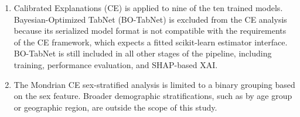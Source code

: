 \begin{enumerate}
    \item Calibrated Explanations (CE) is applied to nine of the ten trained models. Bayesian-Optimized TabNet (BO-TabNet) is excluded from the CE analysis because its serialized model format is not compatible with the requirements of the CE framework, which expects a fitted scikit-learn estimator interface. BO-TabNet is still included in all other stages of the pipeline, including training, performance evaluation, and SHAP-based XAI.

    \item The Mondrian CE sex-stratified analysis is limited to a binary grouping based on the sex feature. Broader demographic stratifications, such as by age group or geographic region, are outside the scope of this study.
\end{enumerate}

